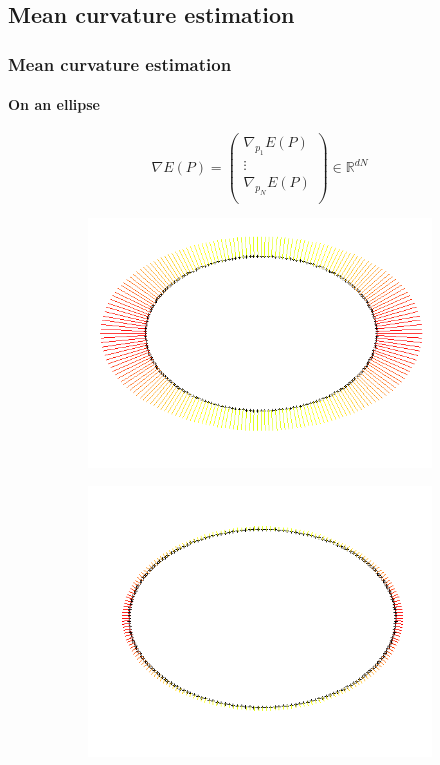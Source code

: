 \documentclass{beamer}
\newcommand{\R}{\mathbb{R}}
\begin{document}
\subsection{Mean curvature estimation}
\begin{frame}
    \frametitle{Mean curvature estimation}
    \framesubtitle{On an ellipse}

    $$
    \nabla E(P) =
        \begin{pmatrix}
            \nabla_{p_1} E(P) \\
            \vdots \\
            \nabla_{p_N} E(P) \\
        \end{pmatrix}
        \in \R^{dN}
    $$

    \begin{figure}
        \centering
        \begin{subfigure}{.45\textwidth}
            \centering
            \includegraphics[scale=0.3]{img/curvature-ellipse-200-15-area}
        \end{subfigure}
        \begin{subfigure}{.45\textwidth}
            \centering
            \includegraphics[scale=0.3]{img/curvature-ellipse-200-15-perimeter}

\end{subfigure}
\end{figure}
\end{frame}
\end{document}
